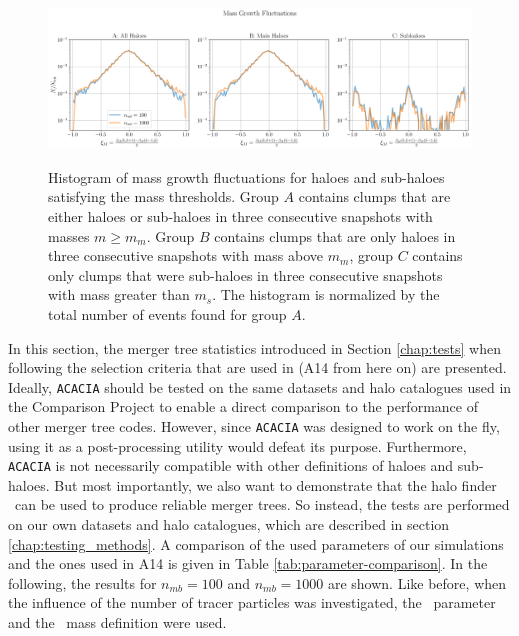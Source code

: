 \begin{figure}
	\centering
	\includegraphics[width=\textwidth, keepaspectratio]{images/tree-statistics-sussing-threshold/mass_fluctuations-ntrace.png}\\%
	\caption{
		Histogram of mass growth fluctuations for haloes and sub-haloes satisfying the mass thresholds.
		Group $A$ contains clumps that are either haloes or sub-haloes in three consecutive snapshots with masses $m \geq m_{m}$.
		Group $B$ contains clumps that are only haloes in three consecutive snapshots with mass above $m_{m}$, group $C$ contains only clumps that were sub-haloes in three consecutive snapshots with mass greater than $m_{s}$.
		The histogram is normalized by the total number of events found for group $A$.
	}%
	\label{fig:sussing-mass-fluct}
\end{figure}




In this section, the merger tree statistics introduced in Section \ref{chap:tests} when following the selection criteria that are used in \citet{SUSSING_HALOFINDER} (A14 from here on) are presented.
Ideally, \texttt{ACACIA} should be tested on the same datasets and halo catalogues used in the Comparison Project to enable a direct comparison to the performance of other merger tree codes. 
However, since \texttt{ACACIA} was designed to work on the fly, using it as a post-processing utility would defeat its purpose.
Furthermore, \texttt{ACACIA} is not necessarily compatible with other definitions of haloes and sub-haloes.
But most importantly, we also want to demonstrate that the halo finder \phew\ can be used to produce reliable merger trees. 
So instead, the tests are performed on our own datasets and halo catalogues, which are described in section \ref{chap:testing_methods}.
A comparison of the used parameters of our simulations and the ones used in A14 is given in Table \ref{tab:parameter-comparison}.
In the following, the results for $n_{mb} = 100$ and $n_{mb} = 1000$ are shown.
Like before, when the influence of the number of tracer particles was investigated, the \sad\ parameter and the \exc\ mass definition were used.



